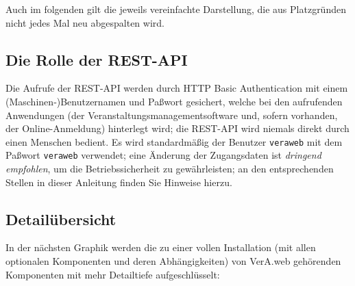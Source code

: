 \documentclass{tarentanleitung}
\begin{document}
\begin{minipage}{\linewidth}
\vspace{5mm}
\end{minipage}

\vspace{5mm}

Auch im folgenden gilt die jeweils vereinfachte Darstellung,
die aus Platzgründen nicht jedes Mal neu abgespalten wird.

\subsection{Die Rolle der REST-API}\label{subsec:intro-restapi}

Die Aufrufe der REST-API werden durch HTTP Basic Authentication mit einem
(Maschinen‑)Benutzernamen und Paßwort gesichert, welche bei den aufrufenden
Anwendungen (der Veranstaltungsmanagementsoftware und, sofern vorhanden, der
Online-Anmeldung) hinterlegt wird; die REST-API wird niemals direkt durch
einen Menschen bedient. Es wird standardmäßig der Benutzer \texttt{veraweb}
mit dem Paßwort \texttt{veraweb} verwendet; eine Änderung der Zugangsdaten
ist \emph{dringend empfohlen}, um die Betriebssicherheit zu gewährleisten;
an den entsprechenden Stellen in dieser Anleitung finden Sie Hinweise hierzu.

\subsection{Detailübersicht}\label{subsec:intro-overview-coarse}

In der nächsten Graphik werden die zu einer vollen Installation (mit allen
optionalen Komponenten und deren Abhängigkeiten) von VerA.web gehörenden
Komponenten mit mehr Detailtiefe aufgeschlüsselt:\keinumbruch
\end{document}
